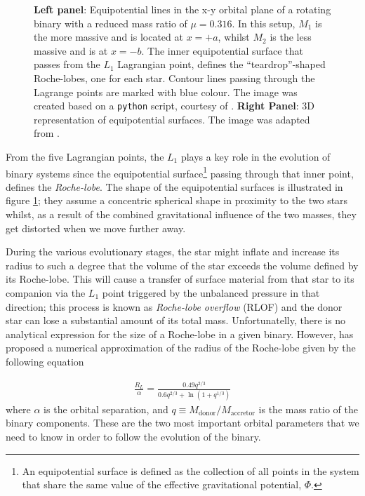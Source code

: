 \documentclass[../../main/thesis_msc.tex]{subfiles}
\begin{document}
\begin{figure}[h]
\begin{subfigure}[h]{0.535\textwidth}
   					 \end{subfigure}
   					 \caption{\textbf{Left panel}: Equipotential lines in the x-y orbital plane of a rotating binary with a reduced mass ratio of $\mu = 0.316$. In this setup, $M_1$ is the more massive and is located at $x = +a$, whilst $M_2$ is the less massive and is at $x = -b$. The inner equipotential surface that passes from the $L_1$ Lagrangian point, defines the ``teardrop''-shaped Roche-lobes, one for each star. Contour lines passing through the Lagrange points are marked with blue colour. The image was created based on a \texttt{python} script, courtesy of \cite{Zingale}. \textbf{Right Panel}: 3D representation of equipotential surfaces. The image was adapted from \cite{Sluijs}.}
   					 \label{fig:eq_sur}
				\end{figure}
				
				From the five Lagrangian points, the $L_1$ plays a key role in the evolution of binary systems since the equipotential surface\footnote{An equipotential surface is defined as the collection of all points in the system that share the same value of the effective gravitational potential, $\Phi$.} passing through that inner point, defines the \emph{Roche-lobe}. The shape of the equipotential surfaces is illustrated in figure \ref{fig:eq_sur}; they assume a concentric spherical shape in proximity to the two stars whilst, as a result of the combined gravitational influence of the two masses, they get distorted when we move further away.
				
				During the various evolutionary stages, the star might inflate and increase its radius to such a degree that the volume of the star exceeds the volume defined by its Roche-lobe. This will cause a transfer of surface material from that star to its companion via the $L_1$ point triggered by the unbalanced pressure in that direction; this process is known as \emph{Roche-lobe overflow} (RLOF) and the donor star can lose a substantial amount of its total mass. Unfortunatelly, there is no analytical expression for the size of a Roche-lobe in a given binary. However, \cite{Eggleton1983} has proposed a numerical approximation of the radius of the Roche-lobe given by the following equation
				
				\begin{eqnarray}
					\label{eq:rl_radius}
					\frac{R_L}{\alpha} = \frac{0.49 q^{2/3}}{0.6 q^{2/3} + \ln(1 + q^{1/3})}
				\end{eqnarray}				 
				where $\alpha$ is the orbital separation, and $q \equiv M_{\text{donor}} / M_{\text{accretor}}$ is the mass ratio of the binary components. These are the two most important orbital parameters that we need to know in order to follow the evolution of the binary.
				
\end{document}
